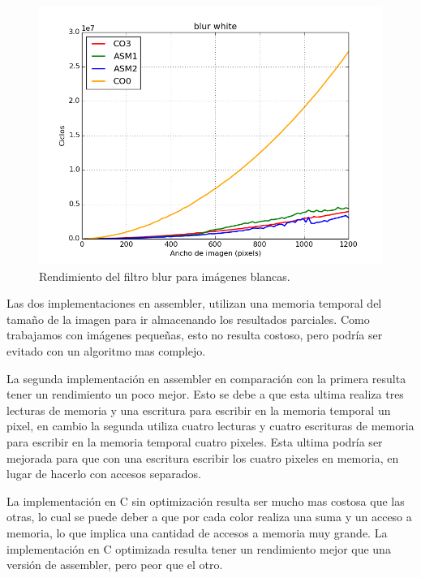 \documentclass[a4paper]{article}
\begin{document}
\begin{figure}[H]
	\begin{center}
		\includegraphics[scale=0.4]{../tp2-bundle.v2/Testing/plots/all/blur-white--all.png}
		\caption{Rendimiento del filtro blur para imágenes blancas.}
		\label{fig:exp1-1}
	\end{center}
\end{figure}



Las dos implementaciones en assembler, utilizan una memoria temporal del tamaño de la imagen para ir almacenando los resultados parciales. Como trabajamos con imágenes pequeñas, esto no resulta costoso, pero podría ser evitado con un algoritmo mas complejo.

La segunda implementación en assembler en comparación con la primera resulta tener un rendimiento un poco mejor. Esto se debe a que esta ultima realiza tres lecturas de memoria y una escritura para escribir en la memoria temporal un pixel, en cambio la segunda utiliza cuatro lecturas y cuatro escrituras de memoria para escribir en la memoria temporal cuatro pixeles. Esta ultima podría ser mejorada para que con una escritura escribir los cuatro pixeles en memoria, en lugar de hacerlo con accesos separados.

La implementación en C sin optimización resulta ser mucho mas costosa que las otras, lo cual se puede deber a que por cada color realiza una suma y un acceso a memoria, lo que implica una cantidad de accesos a memoria muy grande. La implementación en C optimizada resulta tener un rendimiento mejor que una versión de assembler, pero peor que el otro.
\end{document}
